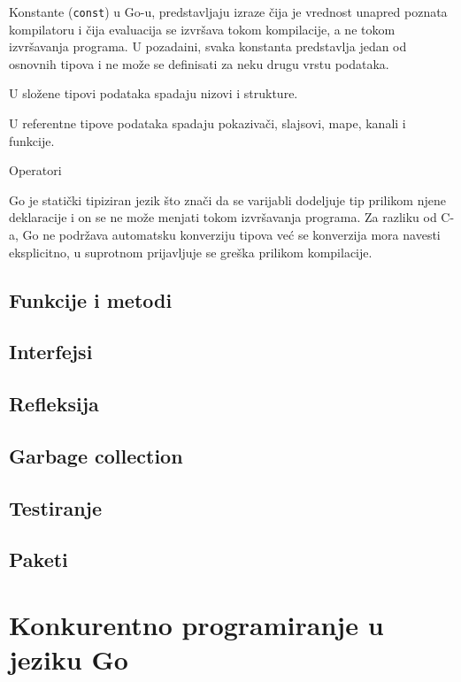 \documentclass[12pt,oneside]{memoir}
\begin{document}
Konstante (\texttt{const}) u Go-u, predstavljaju izraze čija je vrednost unapred poznata kompilatoru i čija evaluacija se izvršava tokom kompilacije, a ne tokom izvršavanja programa. U pozadaini, svaka konstanta predstavlja jedan od osnovnih tipova i ne može se definisati za neku drugu vrstu podataka. 

U složene tipovi podataka spadaju nizovi i strukture. 

U referentne tipove podataka spadaju pokazivači, slajsovi, mape, kanali i funkcije. 

Operatori

Go je statički tipiziran jezik što znači da se varijabli dodeljuje tip prilikom njene deklaracije i on se ne može menjati tokom izvršavanja programa. Za razliku od C-a, Go ne podržava automatsku konverziju tipova već se konverzija mora navesti eksplicitno, u suprotnom prijavljuje se greška prilikom kompilacije. 

\section{Funkcije i metodi}
 
\section{Interfejsi}

\section{Refleksija}

\section{Garbage collection}

\section{Testiranje}

\section{Paketi}


\chapter{Konkurentno programiranje u jeziku Go}
\end{document}
